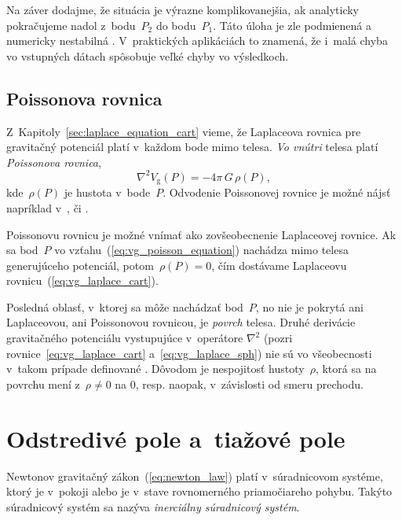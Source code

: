 \documentclass[a4paper,12pt]{book}
\newcommand{\gidx}{\mathrm g}
\begin{document}
Na záver dodajme, že situácia je výrazne komplikovanejšia, ak analyticky 
pokračujeme nadol z~bodu~$P_2$ do bodu~$P_1$.  Táto úloha je zle podmienená 
a numericky nestabilná \parencite{SansoGeodeticBoundaryValueProblem}.  
V~praktických aplikáciách to znamená, že i~malá chyba vo vstupných dátach 
spôsobuje veľké chyby vo výsledkoch.






\subsection{Poissonova rovnica}
\label{sec:poisson_equation}

Z~Kapitoly~\ref{sec:laplace_equation_cart} vieme, že Laplaceova rovnica pre
gravitačný potenciál platí v~každom bode mimo telesa.  \emph{Vo vnútri} telesa
platí \emph{Poissonova rovnica},
%
\begin{equation}
\label{eq:vg_poisson_equation}
\nabla^2 V_\gidx(P) = -4 \pi \, G \, \rho(P){,}
\end{equation}
%
kde~$\rho(P)$ je hustota v~bode~$P$.  Odvodenie Poissonovej rovnice je možné
nájsť napríklad v~\textcite{MacMillan1930}, \textcite{Kellogg1967} či
\textcite{SansoGeoidDetermination}.

Poissonovu rovnicu je možné vnímať ako zovšeobecnenie Laplaceovej rovnice.  Ak
sa bod~$P$ vo vzťahu~(\ref{eq:vg_poisson_equation}) nachádza mimo telesa
generujúceho potenciál, potom~$\rho(P) = 0$, čím dostávame Laplaceovu
rovnicu~(\ref{eq:vg_laplace_cart}).

Posledná oblasť, v~ktorej sa môže nachádzať bod~$P$, no nie je pokrytá ani 
Laplaceovou, ani Poissonovou rovnicou, je \emph{povrch} telesa.  Druhé 
derivácie gravitačného potenciálu vystupujúce v~operátore $\nabla^2$ (pozri 
rovnice~\ref{eq:vg_laplace_cart} a~\ref{eq:vg_laplace_sph}) nie sú vo 
všeobecnosti v~takom prípade definované \parencite{Kellogg1967}.  Dôvodom je 
nespojitosť hustoty~$\rho$, ktorá sa na povrchu mení z~$\rho \neq 0$ na 0, 
resp. naopak, v~závislosti od smeru prechodu.






\section{Odstredivé pole a~tiažové pole}
\label{sec:centrifugal_gravity_field}

Newtonov gravitačný zákon~(\ref{eq:newton_law}) platí v~súradnicovom systéme,
ktorý je v~pokoji alebo je v~stave rovnomerného priamočiareho pohybu.  Takýto
súradnicový systém sa nazýva \emph{inerciálny súradnicový systém}.
\end{document}
